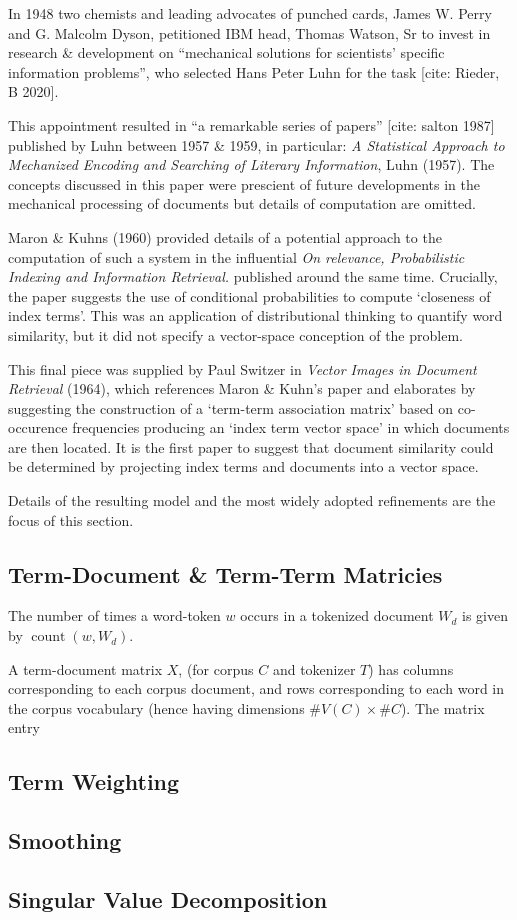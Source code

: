 In 1948 two chemists and leading advocates of punched cards, James W. Perry and G. Malcolm Dyson, petitioned IBM head, Thomas Watson, Sr to invest in research \& development on ``mechanical solutions for scientists’ specific information problems'', who selected Hans Peter Luhn for the task [cite: Rieder, B 2020].

This appointment resulted in ``a remarkable series of papers'' [cite: salton 1987] published by Luhn between 1957 \& 1959, in particular: \emph{A Statistical Approach to Mechanized Encoding and Searching of Literary Information}, Luhn (1957). The concepts discussed in this paper were prescient of future developments in the mechanical processing of documents but details of computation are omitted.

Maron \& Kuhns (1960) provided details of a potential approach to the computation of such a system in the influential \emph{On relevance, Probabilistic Indexing and Information Retrieval.} published around the same time. Crucially, the paper suggests the use of conditional probabilities to compute `closeness of index terms'. This was an application of distributional thinking to quantify word similarity, but it did not specify a vector-space conception of the problem.

This final piece was supplied by Paul Switzer in \emph{Vector Images in Document Retrieval} (1964), which references Maron \& Kuhn's paper and elaborates by suggesting the construction of a `term-term association matrix' based on co-occurence frequencies producing an `index term vector space' in which documents are then located. It is the first paper to suggest that document similarity could be determined by projecting index terms and documents into a vector space.


Details of the resulting model and the most widely adopted refinements are the focus of this section.

\subsection{Term-Document \& Term-Term Matricies}

\begin{definition}
  The number of times a word-token $w$ occurs in a tokenized document $W_d$ is given by $\operatorname{count}(w,W_d)$.
\end{definition}

\begin{definition}
  A term-document matrix $X$, (for corpus $C$ and tokenizer $T$) has columns corresponding to each corpus document, and rows corresponding to each word in the corpus vocabulary (hence having dimensions $\#V(C)\times \#C$). The matrix entry 
\end{definition}

\subsection{Term Weighting}

\subsection{Smoothing}

\subsection{Singular Value Decomposition}
